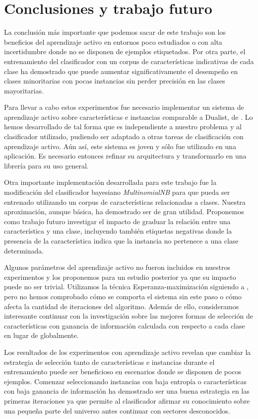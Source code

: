 
\chapter*{Conclusiones y trabajo futuro}

La conclusión más importante que podemos sacar de este trabajo son los beneficios del aprendizaje activo en entornos poco estudiados o con alta incertidumbre donde no se disponen de ejemplos etiquetados. Por otra parte, el entrenamiento del clasificador con un corpus de características indicativas de cada clase ha demostrado que puede aumentar significativamente el desempeño en clases minoritarias con pocas instancias sin perder precisión en las clases mayoritarias.

Para llevar a cabo estos experimentos fue necesario implementar un sistema de aprendizaje activo sobre características e instancias comparable a Dualist, de \citet{dualist}. Lo hemos desarrollado de tal forma que es independiente a nuestro problema y al clasificador utilizado, pudiendo ser adaptado a otras tareas de clasificación con aprendizaje activo. Aún así, este sistema es joven y sólo fue utilizado en una aplicación. Es necesario entonces refinar su arquitectura y transformarlo en una librería para su uso general.

Otra importante implementación desarrollada para este trabajo fue la modificación del clasificador bayesiano \textit{MultinomialNB} para que pueda ser entrenado utilizando un corpus de características relacionadas a clases. Nuestra aproximación, aunque básica, ha demostrado ser de gran utilidad. Proponemos como trabajo futuro investigar el impacto de graduar la relación entre una característica y una clase, incluyendo también etiquetas negativas donde la presencia de la característica indica que la instancia no pertenece a una clase determinada.

Algunos parámetros del aprendizaje activo no fueron incluidos en nuestros experimentos y los proponemos para un estudio posterior ya que su impacto puede no ser trivial. Utilizamos la técnica Esperanza-maximización siguiendo a \citet{dualist}, pero no hemos comprobado cómo se comporta el sistema sin este paso o cómo afecta la cantidad de iteraciones del algoritmo. Además de ello, consideramos interesante continuar con la investigación sobre las mejores formas de selección de características con ganancia de información calculada con respecto a cada clase en lugar de globalmente.

Los resultados de los experimentos con aprendizaje activo revelan que cambiar la estrategia de selección tanto de características e instancias durante el entrenamiento puede ser beneficioso en escenarios donde se disponen de pocos ejemplos. Comenzar seleccionando instancias con baja entropía o características con baja ganancia de información ha demostrado ser una buena estrategia en las primeras iteraciones ya que permite al clasificador afirmar su conocimiento sobre una pequeña parte del universo antes continuar con sectores desconocidos.


